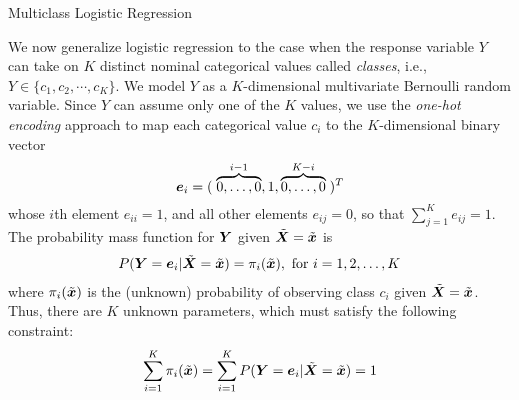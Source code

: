 \begin{frame}{Multiclass Logistic Regression}

We now generalize logistic regression to the case when the response
variable $Y$ can take on $K$ distinct nominal categorical values called
{\em classes}, i.e.,
$Y \in \{c_1, c_2, \cdots, c_K\}$. We model $Y$ as a $K$-dimensional
multivariate Bernoulli random variable. %
Since $Y$ can assume only one of
the $K$ values, we use the {\em one-hot encoding} approach to map each
categorical value $c_i$ to the $K$-dimensional binary vector 
$${\boldsymbol e}_i =
(\;\overbrace{0,\ldots,0}^{i-1},1,\overbrace{0,\ldots,0}^{K-i}\;)^T$$
whose $i$th element $e_{ii}=1$, and all other elements
$e_{ij} = 0$, so that $\sum_{j=1}^K e_{ij} = 1$.
%
The probability mass function for ${\boldsymbol Y}$ given $\tilde{{\boldsymbol X}}=\tilde{{\boldsymbol x}}$ is
\begin{align*}
    P({\boldsymbol Y}={\boldsymbol e}_i|\tilde{{\boldsymbol X}} = \tilde{{\boldsymbol x}}) = \pi_i(\tilde{{\boldsymbol x}}), \text{ for } i=1,2,\ldots,K
\end{align*}
where $\pi_i(\tilde{{\boldsymbol x}})$ is the (unknown) probability of observing class $c_i$ 
given $\tilde{{\boldsymbol X}} = \tilde{{\boldsymbol x}}$.
Thus, there are $K$ unknown parameters, which must satisfy the following
constraint:
\begin{align*}
    \sum^{K}_{i=1} \pi_i(\tilde{{\boldsymbol x}}) = \sum^{K}_{i=1} P({\boldsymbol Y}={\boldsymbol e}_i|\tilde{{\boldsymbol X}}=\tilde{{\boldsymbol x}}) = 1
\end{align*}
%

\end{frame}

